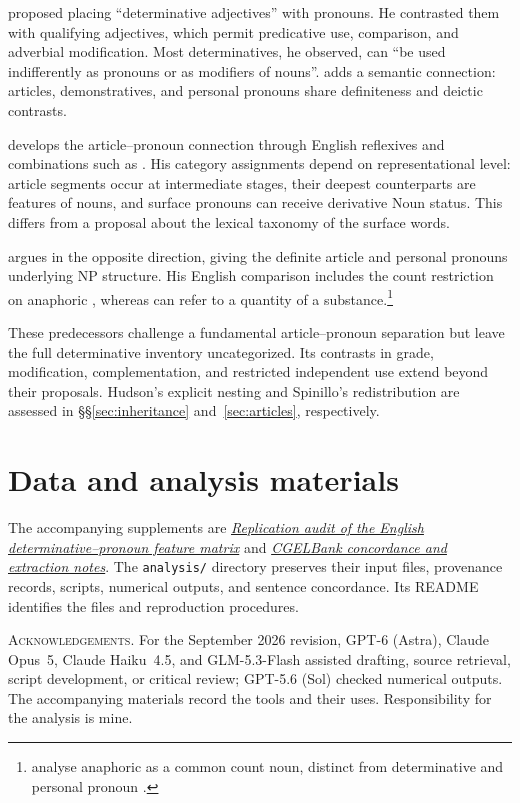 \documentclass[12pt]{article}
\begin{document}
\textcite[24]{palmer1924} proposed placing \enquote{determinative adjectives} with pronouns. He contrasted them with qualifying adjectives, which permit predicative use, comparison, and adverbial modification. Most determinatives, he observed, can \enquote{be used indifferently as pronouns or as modifiers of nouns}. \textcite[279]{lyons1968} adds a semantic connection: articles, demonstratives, and personal pronouns share definiteness and deictic contrasts.

\textcite{postal1966} develops the article--pronoun connection through English reflexives and combinations such as . His category assignments depend on representational level: article segments occur at intermediate stages, their deepest counterparts are features of nouns, and surface pronouns can receive derivative Noun status. This differs from a proposal about the lexical taxonomy of the surface words.

\textcite[197--203]{sommerstein1972} argues in the opposite direction, giving the definite article and personal pronouns underlying NP structure. His English comparison includes the count restriction on anaphoric , whereas  can refer to a quantity of a substance.\footnote{\textcite[797--798]{payne2013anaphoric} analyse anaphoric  as a common count noun, distinct from determinative  and personal pronoun .}

These predecessors challenge a fundamental article--pronoun separation but leave the full determinative inventory uncategorized. Its contrasts in grade, modification, complementation, and restricted independent use extend beyond their proposals. Hudson's explicit nesting and Spinillo's redistribution are assessed in §§\ref{sec:inheritance} and~\ref{sec:articles}, respectively.

\section*{Data and analysis materials}

The accompanying supplements are \href{run:matrix-audit.pdf}{\textit{Replication audit of the English determinative--pronoun feature matrix}} and \href{run:corpus-documentation.pdf}{\textit{CGELBank concordance and extraction notes}}. The \texttt{analysis/} directory preserves their input files, provenance records, scripts, numerical outputs, and sentence concordance. Its README identifies the files and reproduction procedures.

\vspace{0.5\baselineskip}
\noindent\textsc{Acknowledgements.} For the September 2026 revision, GPT-6 (Astra), Claude Opus~5, Claude Haiku~4.5, and GLM-5.3-Flash assisted drafting, source retrieval, script development, or critical review; GPT-5.6 (Sol) checked numerical outputs. The accompanying materials record the tools and their uses. Responsibility for the analysis is mine.

\clearpage
\printbibliography
\end{document}
